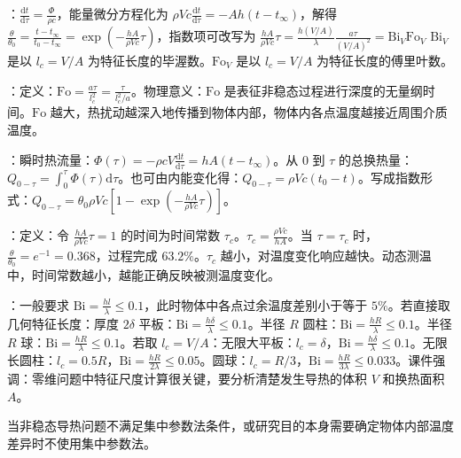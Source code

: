 ：$\frac{\mathrm{d}t}{\mathrm{d}\tau}=\frac{\Phi}{\rho c}$，能量微分方程化为 $\rho Vc\frac{\mathrm{d}t}{\mathrm{d}\tau}=-Ah(t-t_\infty)$，解得 $\frac{\theta}{\theta_0}=\frac{t-t_\infty}{t_0-t_\infty}=\exp\left(-\frac{hA}{\rho Vc}\tau\right)$，指数项可改写为 $\frac{hA}{\rho Vc}\tau=\frac{h(V/A)}{\lambda}\frac{a\tau}{(V/A)^2}=\mathrm{Bi}_V\mathrm{Fo}_V$ $\mathrm{Bi}_V$ 是以 $l_c=V/A$ 为特征长度的毕渥数。$\mathrm{Fo}_V$ 是以 $l_c=V/A$ 为特征长度的傅里叶数。

：定义：$\mathrm{Fo}=\frac{a\tau}{l_c^2}=\frac{\tau}{l_c^2/a}$。物理意义：$\mathrm{Fo}$ 是表征非稳态过程进行深度的无量纲时间。$\mathrm{Fo}$ 越大，热扰动越深入地传播到物体内部，物体内各点温度越接近周围介质温度。

：瞬时热流量：$\Phi(\tau)=-\rho cV\frac{\mathrm{d}t}{\mathrm{d}\tau}=hA(t-t_\infty)$。从 $0$ 到 $\tau$ 的总换热量：$Q_{0-\tau}=\int_0^\tau\Phi(\tau)\mathrm{d}\tau$。也可由内能变化得：$Q_{0-\tau}=\rho Vc(t_0-t)$。写成指数形式：$Q_{0-\tau}=\theta_0\rho Vc\left[1-\exp\left(-\frac{hA}{\rho Vc}\tau\right)\right]$。

：定义：令 $\frac{hA}{\rho Vc}\tau=1$ 的时间为时间常数 $\tau_c$。$\tau_c=\frac{\rho Vc}{hA}$。当 $\tau=\tau_c$ 时，$\frac{\theta}{\theta_0}=e^{-1}=0.368$，过程完成 $63.2\%$。$\tau_c$ 越小，对温度变化响应越快。动态测温中，时间常数越小，越能正确反映被测温度变化。

：一般要求 $\mathrm{Bi}=\frac{hl}{\lambda}\le 0.1$，此时物体中各点过余温度差别小于等于 $5\%$。若直接取几何特征长度：厚度 $2\delta$ 平板：$\mathrm{Bi}=\frac{h\delta}{\lambda}\le 0.1$。半径 $R$ 圆柱：$\mathrm{Bi}=\frac{hR}{\lambda}\le 0.1$。半径 $R$ 球：$\mathrm{Bi}=\frac{hR}{\lambda}\le 0.1$。若取 $l_c=V/A$：无限大平板：$l_c=\delta$，$\mathrm{Bi}=\frac{h\delta}{\lambda}\le 0.1$。无限长圆柱：$l_c=0.5R$，$\mathrm{Bi}=\frac{hR}{2\lambda}\le 0.05$。圆球：$l_c=R/3$，$\mathrm{Bi}=\frac{hR}{3\lambda}\le 0.033$。课件强调：零维问题中特征尺度计算很关键，要分析清楚发生导热的体积 $V$ 和换热面积 $A$。

\divider


当非稳态导热问题不满足集中参数法条件，或研究目的本身需要确定物体内部温度差异时不使用集中参数法。

